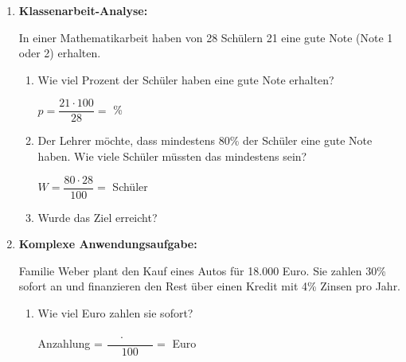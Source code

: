 \begin{enumerate}[label=\arabic*., resume]
    \vspace{1cm}

    \item \textbf{Klassenarbeit-Analyse:}

    In einer Mathematikarbeit haben von 28 Schülern 21 eine gute Note (Note 1 oder 2) erhalten.

    \vspace{0.5cm}

    \begin{enumerate}[label=\alph*)]
        \item Wie viel Prozent der Schüler haben eine gute Note erhalten?

        \vspace{0.3cm}
        $p = \dfrac{21 \cdot 100}{28} = $ \underline{\hspace{2cm}} \%

        \vspace{0.5cm}

        \item Der Lehrer möchte, dass mindestens 80\% der Schüler eine gute Note haben. Wie viele Schüler müssten das mindestens sein?

        \vspace{0.3cm}
        $W = \dfrac{80 \cdot 28}{100} = $ \underline{\hspace{2cm}} Schüler

        \vspace{0.5cm}

        \item Wurde das Ziel erreicht? \underline{\hspace{3cm}}

    \end{enumerate}

    \vspace{1cm}

    \item \textbf{Komplexe Anwendungsaufgabe:}

    Familie Weber plant den Kauf eines Autos für 18.000 Euro. Sie zahlen 30\% sofort an und finanzieren den Rest über einen Kredit mit 4\% Zinsen pro Jahr.

    \vspace{0.5cm}

    \begin{enumerate}[label=\alph*)]
        \item Wie viel Euro zahlen sie sofort?

        \vspace{0.3cm}
        Anzahlung = $\dfrac{\phantom{00} \cdot \phantom{00000}}{100} = $ \underline{\hspace{3cm}} Euro


\end{enumerate}
\end{enumerate}
